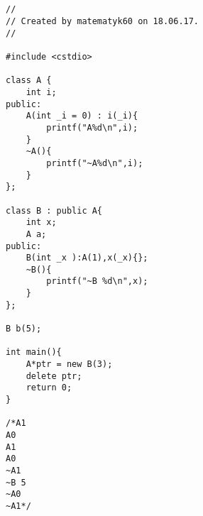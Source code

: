 \documentclass{article}
\begin{document}
\subsection{}
\begin{multicols}{2}
\begin{verbatim}
//
// Created by matematyk60 on 18.06.17.
//

#include <cstdio>

class A {
    int i;
public:
    A(int _i = 0) : i(_i){
        printf("A%d\n",i);
    }
    ~A(){
        printf("~A%d\n",i);
    }
};

class B : public A{
    int x;
    A a;
public:
    B(int _x ):A(1),x(_x){};
    ~B(){
        printf("~B %d\n",x);
    }
};

B b(5);

int main(){
    A*ptr = new B(3);
    delete ptr;
    return 0;
}

/*A1
A0
A1
A0
~A1
~B 5
~A0
~A1*/
\end{verbatim}
\end{multicols}
\end{document}
